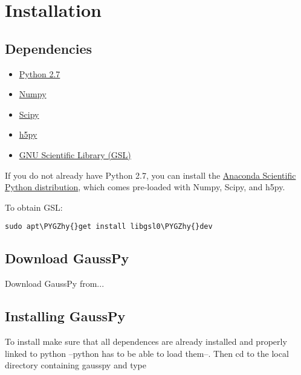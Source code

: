 \documentclass[letterpaper,10pt,openany,oneside]{sphinxmanual}
\def\PYGZhy{\char`\-}
\begin{document}
\chapter{Installation}
\label{install:installation}\label{install::doc}\label{install:install}

\section{Dependencies}
\label{install:dependencies}\begin{itemize}
\item {} 
\href{http://www.numpy.org/}{Python 2.7}

\item {} 
\href{http://www.numpy.org/}{Numpy}

\item {} 
\href{http://www.scipy.org/}{Scipy}

\item {} 
\href{http://www.h5py.org/}{h5py}

\item {} 
\href{http://www.gnu.org/software/gsl/}{GNU Scientific Library (GSL)}

\end{itemize}

If you do not already have Python 2.7, you can
install the
\href{https://store.continuum.io/cshop/anaconda/}{Anaconda Scientific Python distribution},
which comes pre-loaded with Numpy, Scipy, and h5py.

To obtain GSL:

\begin{Verbatim}[commandchars=\\\{\}]
sudo apt\PYGZhy{}get install libgsl0\PYGZhy{}dev
\end{Verbatim}


\section{Download GaussPy}
\label{install:download-gausspy}
Download GaussPy from...


\section{Installing GaussPy}
\label{install:installing-gausspy}
To install make sure that all
dependences are already installed and properly linked to python
--python has to be able to load them--. Then cd to the local directory
containing gausspy and type
\end{document}
